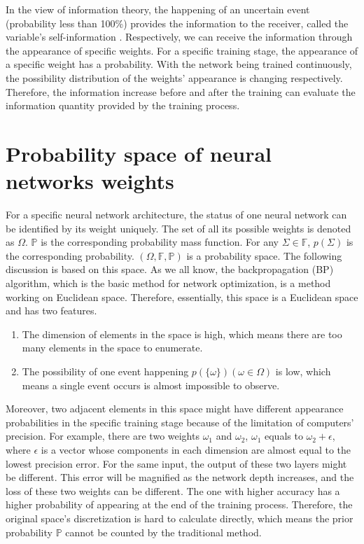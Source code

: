 \documentclass[letterpaper]{article} %
\begin{document}
In the view of information theory, the happening of an uncertain event (probability less than 100\%) provides the information to the receiver, called the variable's self-information \cite{jones1979elementary}. Respectively, we can receive the information through the appearance of specific weights. For a specific training stage, the appearance of a specific weight has a probability. With the network being trained continuously, the possibility distribution of the weights' appearance is changing respectively. Therefore, the information increase before and after the training can evaluate the information quantity provided by the training process.

\section{Probability space of neural networks weights}
For a specific neural network architecture, the status of one neural network can be identified by its weight uniquely. The set of all its possible weights is denoted as $\Omega$. $\mathbb{P}$ is the corresponding probability mass function. For any $\Sigma \in \mathbb{F}$, $p(\Sigma)$ is the corresponding probability. $(\Omega,\mathbb{F},\mathbb{P})$ is a probability space. The following discussion is based on this space. As we all know, the backpropagation (BP) algorithm, which is the basic method for network optimization, is a method working on Euclidean space. Therefore, essentially, this space is a Euclidean space and has two features.
\begin{enumerate}
    \item The dimension of elements in the space is high, which means there are too many elements in the space to enumerate.
    \item The possibility of one event happening $p(\{\omega\}) (\omega \in \Omega)$ is low, which means a single event occurs is almost impossible to observe.
\end{enumerate}
Moreover, two adjacent elements in this space might have different appearance probabilities in the specific training stage because of the limitation of computers' precision. For example, there are two weights $\omega_1$ and $\omega_2$, $\omega_1$ equals to $\omega_2 + \mathbb{\epsilon}$, where $\mathbb{\epsilon}$ is a vector whose components in each dimension are almost equal to the lowest precision error. For the same input, the output of these two layers might be different. This error will be magnified as the network depth increases, and the loss of these two weights can be different. The one with higher accuracy has a higher probability of appearing at the end of the training process. Therefore, the original space's discretization is hard to calculate directly, which means the prior probability $\mathbb{P}$ cannot be counted by the traditional method.
\end{document}
